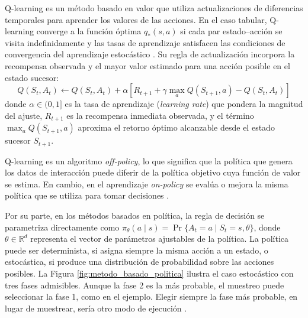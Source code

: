 Q-learning es un método basado en valor que utiliza actualizaciones de diferencias temporales para aprender los valores de las acciones. En el caso tabular, Q-learning converge a la función óptima $q_*(s,a)$ si cada par estado--acción se visita indefinidamente y las tasas de aprendizaje satisfacen las condiciones de convergencia del aprendizaje estocástico \cite{marlbook}. Su regla de actualización incorpora la recompensa observada y el mayor valor estimado para una acción posible en el estado sucesor:
\begin{equation}
    Q(S_t, A_t) \leftarrow Q(S_t, A_t) + \alpha \left[ R_{t+1} + \gamma \max_a Q(S_{t+1}, a) - Q(S_t, A_t) \right]
    \label{eq:q_learning}
\end{equation}
donde $\alpha \in (0, 1]$ es la tasa de aprendizaje (\textit{learning rate}) que pondera la magnitud del ajuste, $R_{t+1}$ es la recompensa inmediata observada, y el término $\max_a Q(S_{t+1}, a)$ aproxima el retorno óptimo alcanzable desde el estado sucesor $S_{t+1}$.

Q-learning es un algoritmo \textit{off-policy}, lo que significa que la política que genera los datos de interacción puede diferir de la política objetivo cuya función de valor se estima. En cambio, en el aprendizaje \textit{on-policy} se evalúa o mejora la misma política que se utiliza para tomar decisiones \cite{suttonRL}.

Por su parte, en los métodos basados en política, la regla de decisión se parametriza directamente como $\pi_\theta(a \mid s) = \Pr\{A_t = a \mid S_t = s, \theta\}$, donde $\theta \in \mathbb{R}^d$ representa el vector de parámetros ajustables de la política. La política puede ser determinista, si asigna siempre la misma acción a un estado, o estocástica, si produce una distribución de probabilidad sobre las acciones posibles. La Figura \ref{fig:metodo_basado_politica} ilustra el caso estocástico con tres fases admisibles. Aunque la fase 2 es la más probable, el muestreo puede seleccionar la fase 1, como en el ejemplo. Elegir siempre la fase más probable, en lugar de muestrear, sería otro modo de ejecución \cite{suttonRL}.

